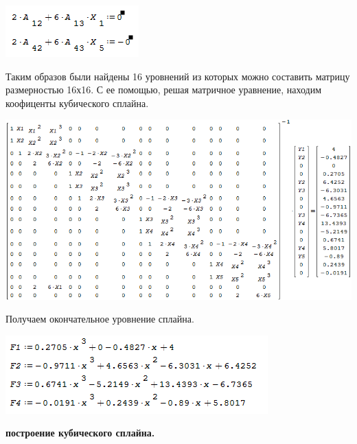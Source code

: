 \documentclass[russian,utf8,nocolumnxxxi,nocolumnxxxii]{eskdtext}
\begin{document}
{\begin{center}\includegraphics[scale=0.8]{2019-01-09_03-34-49}\end{center}
\newpage
\par
\normalsize
Таким образов были найдены 16 уровнений из которых можно составить матрицу размерностью 16х16. С ее помощью, решая матричное уравнение, находим коофиценты кубического сплайна.
\begin{center}\includegraphics[scale=0.6]{2019-01-09_03-36-31}\end{center}
\par
\normalsize
Получаем окончательное уровнение сплайна.
\begin{center}\includegraphics[scale=0.75]{2019-01-09_03-42-54}\end{center}
\newpage
\begin{center}{\bf построение кубического сплайна.}\\\end{center}
}
\end{document}
